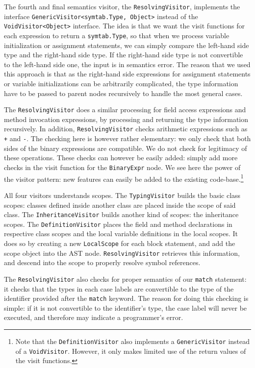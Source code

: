 \documentclass[twocolumn]{article}
\begin{document}
The fourth and final semantics visitor, the \verb|ResolvingVisitor|, implements the interface \verb|GenericVisitor<symtab.Type, Object>|
instead of the \verb|VoidVisitor<Object>| interface. The idea is that we want the visit functions for each expression to return a \verb|symtab.Type|, so that when we process variable initialization or assignment statements, we can simply compare the left-hand side type and the right-hand side type. If the right-hand side type is not convertible to the left-hand side one, the input is in semantics error. The reason that we used this approach is that as the right-hand side expressions for assignment statements or variable initializations can be arbitrarily complicated, the type information have to be passed to parent nodes recursively to handle the most general cases.

The \verb|ResolvingVisitor| does a similar processing for field access expressions and method invocation expressions, by processing and returning the type information recursively. In addition, \verb|ResolvingVisitor| checks arithmetic expressions such as \verb|+| and \verb|-|. The checking here is however rather elementary: we only check that both sides of the binary expressions are compatible. We do not check for legitimacy of these operations. These checks can however be easily added: simply add more checks in the visit function for the \verb|BinaryExpr| node. We see here the power of the visitor pattern: new features can easily be added to the existing code-base.\footnote{Note that the {\tt DefinitionVisitor} also implements a {\tt GenericVisitor} instead of a {\tt VoidVisitor}. However, it only makes limited use of the return values of the visit functions.}

All four visitors understands scopes. The \verb|TypingVisitor| builds the basic class scopes: classes defined inside another class are placed inside the scope of said class. The \verb|InheritanceVisitor| builds another kind of scopes: the inheritance scopes. The \verb|DefinitionVisitor| places the field and method declarations in respective class scopes and the local variable definitions in the local scopes. It does so by creating a new \verb|LocalScope| for each block statement, and add the scope object into the AST node. \verb|ResolvingVisitor| retrieves this information, and descend into the scope to properly resolve symbol references.

The \verb|ResolvingVisitor| also checks for proper semantics of our \verb|match| statement: it checks that the types in each case labels are convertible to the type of the identifier provided after the \verb|match| keyword. The reason for doing this checking is simple: if it is not convertible to the identifier's type, the case label will never be executed, and therefore may indicate a programmer's error.
\end{document}

